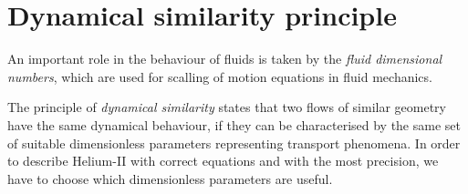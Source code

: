\section{Dynamical similarity principle}

An important role in the behaviour of fluids is taken by the \textit{fluid dimensional numbers}, which are used for scalling of motion equations in fluid mechanics.

The principle of \textit{dynamical similarity} states that two flows of similar geometry have the same dynamical behaviour, if they can be characterised by the same set of suitable dimensionless parameters representing transport phenomena. In order to describe Helium-II with correct equations and with the most precision, we have to choose which dimensionless parameters are useful.

